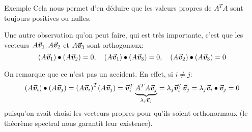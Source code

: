 \documentclass[a4paper]{article}
\begin{document}
\begin{parag}{Exemple}
    Cela nous permet d'en déduire que les valeurs propres de $A^T A$ sont toujours positives ou nulles.

    Une autre observation qu'on peut faire, qui est très importante, c'est que les vecteurs $A \bm{\protect\vec{v}}_1, A \bm{\protect\vec{v}}_2$ et $A \bm{\protect\vec{v}}_3$ sont orthogonaux:
    \[\left(A \bvec{v}_1\right) \dotprod \left(A \bvec{v}_2\right) = 0, \mathspace \left(A \bvec{v}_1\right) \dotprod \left(A \bvec{v}_3\right) = 0, \mathspace \left(A \bvec{v}_2\right) \dotprod \left(A \bvec{v}_3\right) =  0\]

    On remarque que ce n'est pas un accident. En effet, si $i \neq j$:
    \[\left(A \bvec{v}_i\right) \dotprod \left(A \bvec{v}_j\right) = \left(A \bvec{v}_i\right)^T \left(A \bvec{v}_j\right) = \bvec{v}_i^T \underbrace{A^T A \bvec{v}_j}_{\lambda_j \bvec{v}_j} = \lambda_j \bvec{v}_i^T \bvec{v}_j = \lambda_j \bvec{v}_i \dotprod \bvec{v}_j = 0\]
    puisqu'on avait choisi les vecteurs propres pour qu'ils soient orthonormaux (le théorème spectral nous garantit leur existence).

\end{parag}
\end{document}

